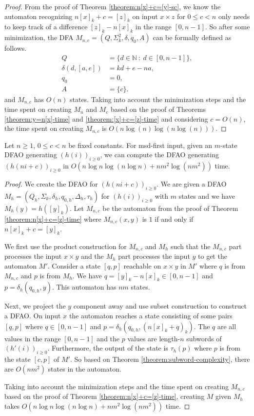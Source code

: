 \documentclass[12pt,reqno]{article}
\def\suchthat{\ : \ }
\begin{document}
\begin{proof}
From the proof of Theorem \ref{theorem:n[x]+c=[y]-sc}, we know the automaton recognizing $n[x]_k + c= [z]_k$ on input $x \times z$ for $0 \leq c < n$ only needs to keep track of a difference $[z]_k - n[x]_k$ in the range $[0, n-1]$. So after some minimization, the DFA $M_{n, c}=(Q, \Sigma^2_k, \delta, q_0, A)$ can be formally defined as follows.
\begin{align*}
Q &= \{ d \in \mathbb{N}  \suchthat d \in [0, n-1] \}, \\
\delta(d, [a, e]) &= kd + e - na,
 \\
q_0 &= 0, \\
A &= \{c\}.
\end{align*}
and $M_{n, c}$ has $O(n)$ states.
Taking into account the minimization steps and the time spent on creating $M_n$ and $M_c$ based on the proof of Theorems \ref{theorem:y=n[x]-time} and \ref{theorem:[x]+c=[z]-time} and considering $c=O(n)$, the time spent on creating $M_{n,c}$ is $O( n\log (n) \log(n \log (n) ) )$.
\end{proof}


\begin{theorem} \label{theorem:h(ni+c)-time}
    Let $n \geq 1$, $0 \leq c < n$ be fixed constants. For msd-first input, given an $m$-state DFAO generating $(h(i))_{i \geq 0}$,
    we can compute
    the DFAO generating $(h(ni+c))_{i \geq 0}$ in  $O(  n\log n \log(n \log n )+ nm^2 \log(nm^2)  )$ time.
\end{theorem}

\begin{proof}
    We create the DFAO for $(h(ni+c))_{i \geq 0}$. 
\sloppy
 We are given a DFAO $M_h=(Q_h, \Sigma_k, \delta_h, q_{0,h}, \Delta_h, \tau_h)$ for $(h(i))_{i \geq 0}$ with $m$ states and we have $M_h(y) = h([y]_k)$.
Let $M_{n, c}$ be the automaton from the proof of Theorem \ref{theorem:n[x]+c=[z]-time} where $M_{n,c}(x, y)$ is $1$ if and only if $n[x]_k + c = [y]_k$.

We first use the product construction for $M_{n, c}$ and $M_h$ such that the  $M_{n,c}$ part processes the input $x \times y$ and the $M_h$ part processes the input $y$ to get the automaton $M'$. Consider a state $[q, p]$ reachable on $x\times y$ in $M'$ where $q$ is from $M_{n, c}$ and $p$ is from $M_h$. We have $q = [y]_k -n[x]_k \in [0, n-1]$ and $p=\delta_h(q_{0,h}, y)$. This automaton has $nm$ states.

Next, we project the $y$ component away and use subset construction to construct a DFAO. On input $x$ the automaton reaches a state consisting of some pairs $[q, p]$ where $q \in [0, n-1]$ and $p = \delta_h(q_{0, h}, (n[x]_k+q)_k)$. The $q$ are all values in the range $[0, n-1]$ and the $p$ values are length-$n$ subwords of $(h'(i))_{i \geq0}$. Furthermore, the output of the state is $\tau_h(p)$ where $p$ is from the state $[c, p]$ of $M'$. So based on Theorem \ref{theorem:subword-complexity}, there are $O(nm^2)$ states in the automaton.

Taking into account the minimization steps and the time spent on creating $M_{n, c}$ based on the proof of Theorem \ref{theorem:n[x]+c=[z]-time}, creating $M$ given $M_h$ takes $O(  n\log n \log(n \log n ) + nm^2 \log(nm^2)  )$ time.
\end{proof}
\end{document}
